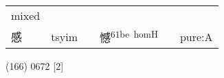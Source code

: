 \documentclass[14pt,a4paper]{scrartcl}
\begin{document}
\begin{longtable}[c]{@{}llllll@{}}
\begin{minipage}[t]{0.14\columnwidth}\raggedright\strut
mixed
\strut\end{minipage}\tabularnewline
\begin{minipage}[t]{0.14\columnwidth}\raggedright\strut
感
\strut\end{minipage} &
\begin{minipage}[t]{0.14\columnwidth}\raggedright\strut
tsyim
\strut\end{minipage} &
\begin{minipage}[t]{0.14\columnwidth}\raggedright\strut
\strut\end{minipage} &
\begin{minipage}[t]{0.14\columnwidth}\raggedright\strut
憾\textsuperscript{61be~homH}
\strut\end{minipage} &
\begin{minipage}[t]{0.14\columnwidth}\raggedright\strut
\strut\end{minipage} &
\begin{minipage}[t]{0.14\columnwidth}\raggedright\strut
pure:A
\strut\end{minipage}\tabularnewline
\bottomrule
\end{longtable}

(166) 0672 {[}2{]}
\end{document}
